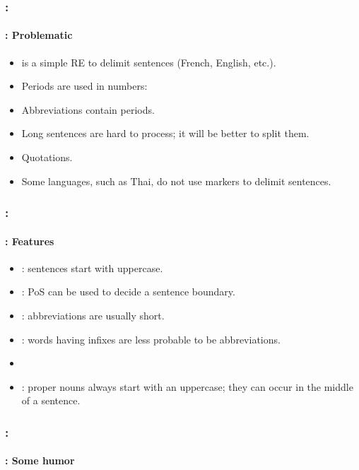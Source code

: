 \documentclass[xcolor=table]{beamer}
\begin{document}
\begin{frame}
	\frametitle{\insertshortsubtitle: \insertsection}
	\framesubtitle{\insertsubsection: Problematic} 

	\begin{itemize}
		\item \expword{/[.?!]/} is a simple RE to delimit sentences (French, English, etc.).
		\item Periods are used in numbers: 
		\item Abbreviations contain periods.
		\item Long sentences are hard to process; it will be better to split them.
		\item Quotations.
		\item Some languages, such as Thai, do not use markers to delimit sentences.
	\end{itemize}

\end{frame}

\begin{frame}
	\frametitle{\insertshortsubtitle: \insertsection}
	\framesubtitle{\insertsubsection: Features} 

	\begin{itemize}
		\item {}: sentences start with uppercase.
		\item {}: PoS can be used to decide a sentence boundary.
		\item {}: abbreviations are usually short.
		\item {}: words having infixes are less probable to be abbreviations.
		\item {} 
		\item {}: proper nouns always start with an uppercase; they can occur in the middle of a sentence.
	\end{itemize}

\end{frame}

\begin{frame}
	\frametitle{\insertshortsubtitle: \insertsection}
	\framesubtitle{\insertsubsection: Some humor} 


	\begin{center}
	\end{center}

\end{frame}
\end{document}
